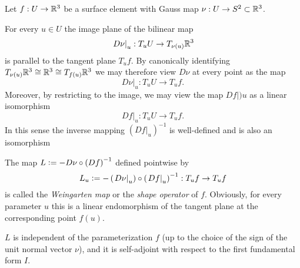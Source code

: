 \documentclass[stu, babel, american, biblatex, a4paper, leqno, draftall]{apa7}
\begin{document}
\begin{definition}\label{Curvature:ShapeOperator}
    Let $f:U\to\mathbb{R}^{3}$ be a surface element with Gauss map $\nu:U\to S^2\subset\mathbb{R}^3$.
    \begin{APAenumerate}
        \item For every $u\in U$ the image plane of the bilinear map
        \begin{equation*}
            \left.D\nu\right|_u:T_uU\to T_{\nu(u)}\mathbb{R}^3
        \end{equation*}
        is parallel to the tangent plane $T_uf$.
        By canonically identifying $T_{\nu(u)}\mathbb{R}^3\cong\mathbb{R}^3\cong T_{f(u)}\mathbb{R}^3$
        we may therefore view $D\nu$ at every point as the map
        \begin{equation*}
            \left.D\nu\right|_u:T_uU\to T_uf \text{.}
        \end{equation*}
        Moreover, by restricting to the image,
        we may view the map $\left.Df\right|)u$ as a linear isomorphism
        \begin{equation*}
            \left.Df\right|_u:T_uU\to T_uf \text{.}
        \end{equation*}
        In this sense
        the inverse mapping $\left(\left.Df\right|_u\right)^{-1}$ is well-defined
        and is also an isomorphism
        \item The map $L\vcentcolon= -D\nu\circ\left(Df\right)^{-1}$ defined pointwise by
        \begin{equation*}
            L_u
            \vcentcolon= -\left(\left.D\nu\right|_u\right)\circ\left(\left.Df\right|_u\right)^{-1}
            : T_uf\to T_uf
        \end{equation*}
        is called the \textit{Weingarten map} or the \textit{shape operator} of $f$.
        Obviously, for every parameter $u$ this is a linear endomorphism of the tangent plane at the corresponding point $f(u)$.
        \item $L$ is independent of the parameterization $f$ (up to the choice of the sign of the unit normal vector $\nu$),
        and it is self-adjoint with respect to the first fundamental form $I$.
    \end{APAenumerate}
\end{definition}
\end{document}
